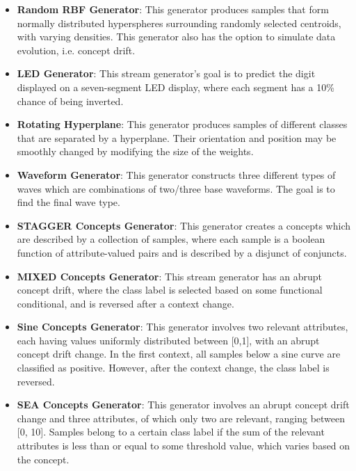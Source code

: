 \documentclass[reqno]{vcuthesis}
\newcommand{\iitem}{\item[-]}
\numberwithin{equation}{chapter}
\begin{document}
\begin{itemize}
\iitem \textbf{Random RBF Generator}: This generator produces samples that form normally distributed hyperspheres surrounding randomly selected centroids, with varying densities. This generator also has the option to simulate data evolution, i.e. concept drift. 

\iitem  \textbf{LED Generator}: This stream generator's goal is to predict the digit displayed on a seven-segment LED display, where each segment has a 10\% chance of being inverted.

\iitem \textbf{Rotating Hyperplane}: This generator produces samples of different classes that are separated by a hyperplane. Their orientation and position may be smoothly changed by modifying the size of the weights.

\iitem \textbf{Waveform Generator}: This generator constructs three different types of waves which are combinations of two/three base waveforms. The goal is to find the final wave type.

\iitem \textbf{STAGGER Concepts Generator}: This generator creates a concepts which are described by a collection of samples, where each sample is a boolean function of attribute-valued pairs and is described by a disjunct of conjuncts.

\iitem \textbf{MIXED Concepts Generator}: This stream generator has an abrupt concept drift, where the class label is selected based on some functional conditional, and is reversed after a context change.

\iitem \textbf{Sine Concepts Generator}: This generator involves two relevant attributes, each having values uniformly distributed between [0,1], with an abrupt concept drift change. In the first context, all samples below a sine curve are classified as positive. However, after the context change, the class label is reversed. 

\iitem \textbf{SEA Concepts Generator}: This generator involves an abrupt concept drift change and three attributes, of which only two are relevant, ranging between [0, 10]. Samples belong to a certain class label if the sum of the relevant attributes is less than or equal to some threshold value, which varies based on the concept. 

\end{itemize}
\end{document}
